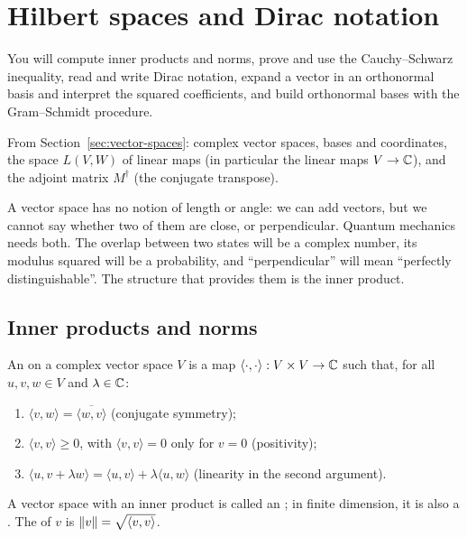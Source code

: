 \section{Hilbert spaces and Dirac notation}\label{sec:hilbert}

\begin{objectives}
  You will compute inner products and norms, prove and use the Cauchy--Schwarz inequality, read and write Dirac notation, expand a vector in an orthonormal basis and interpret the squared coefficients, and build orthonormal bases with the Gram--Schmidt procedure.
\end{objectives}

\begin{recall}
  From Section~\ref{sec:vector-spaces}: complex vector spaces, bases and coordinates, the space $L(V,W)$ of linear maps (in particular the linear maps $V\to\mathbb{C}$), and the adjoint matrix $M^\dagger$ (the conjugate transpose).
\end{recall}

A vector space has no notion of length or angle: we can add vectors, but we cannot say whether two of them are close, or perpendicular. Quantum mechanics needs both. The overlap between two states will be a complex number, its modulus squared will be a probability, and ``perpendicular'' will mean ``perfectly distinguishable''. The structure that provides them is the inner product.

\subsection{Inner products and norms}

\begin{definition}\label{def:inner}
  An  on a complex vector space $V$ is a map $\langle\cdot,\cdot\rangle:V\times V\to\mathbb{C}$ such that, for all $u,v,w\in V$ and $\lambda\in\mathbb{C}$:
  \begin{enumerate}
    \item[(i)] $\langle v,w\rangle=\overline{\langle w,v\rangle}$ (conjugate symmetry);
    \item[(ii)] $\langle v,v\rangle\ge0$, with $\langle v,v\rangle=0$ only for $v=0$ (positivity);
    \item[(iii)] $\langle u,v+\lambda w\rangle=\langle u,v\rangle+\lambda\langle u,w\rangle$ (linearity in the second argument).
  \end{enumerate}
  A vector space with an inner product is called an ; in finite dimension, it is also a . The  of $v$ is $\left\|v\right\|=\sqrt{\langle v,v\rangle}$.
\end{definition}

